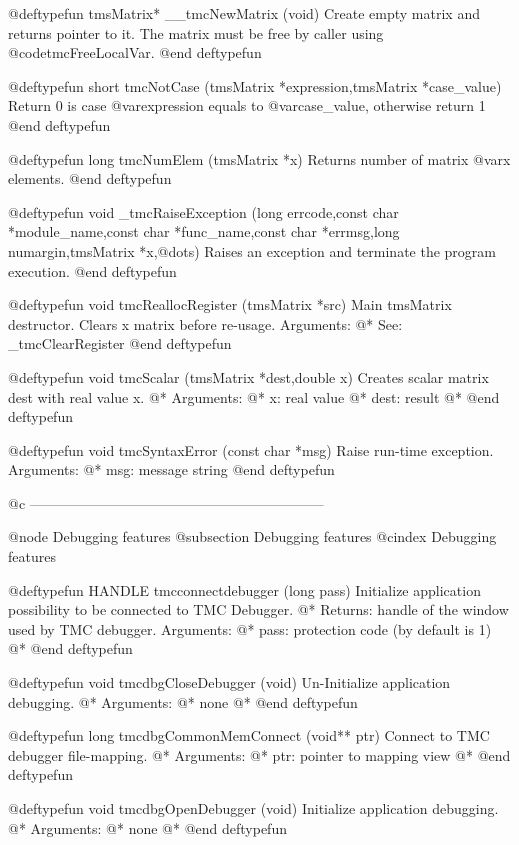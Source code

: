 @deftypefun    tmsMatrix* __tmcNewMatrix (void)
Create empty matrix and returns pointer to it. The matrix must be free by caller using @code{tmcFreeLocalVar}.
@end deftypefun


@deftypefun  short tmcNotCase (tmsMatrix *expression,tmsMatrix *case_value) 
Return 0 is case @var{expression} equals to @var{case_value}, otherwise return 1
@end deftypefun


@deftypefun  long tmcNumElem (tmsMatrix *x) 
Returns number of matrix @var{x} elements.
@end deftypefun



@deftypefun   void _tmcRaiseException (long errcode,const char *module_name,const char *func_name,const char *errmsg,long numargin,tmsMatrix *x,@dots{})
Raises an exception and terminate the program execution.
@end deftypefun


@deftypefun   void tmcReallocRegister (tmsMatrix *src) 
Main tmsMatrix destructor. Clears x matrix before re-usage.	 
Arguments: @*
See: _tmcClearRegister
@end deftypefun


@deftypefun         void tmcScalar (tmsMatrix *dest,double x)
Creates scalar matrix dest with real value x. @*
Arguments: @*
	x: real value @*
	dest: result @*
@end deftypefun
	


@deftypefun         void tmcSyntaxError (const char *msg)
Raise run-time exception.
Arguments: @*
	msg: message string
@end deftypefun

@c ---------------------------------------------------------------

@node Debugging features
@subsection Debugging features
@cindex  Debugging features


@deftypefun         HANDLE tmcconnectdebugger (long pass)
Initialize application possibility to be connected to TMC Debugger. @*
Returns: handle of the window used by TMC debugger.
Arguments: @*
	pass: protection code (by default is 1) @*
@end deftypefun


@deftypefun         void tmcdbgCloseDebugger (void)
Un-Initialize application debugging. @*
Arguments: @*
	none @*
@end deftypefun



@deftypefun         long tmcdbgCommonMemConnect (void** ptr)
Connect to TMC debugger file-mapping. @*
Arguments: @*
	ptr: pointer to mapping view @*
@end deftypefun



@deftypefun         void tmcdbgOpenDebugger (void)
Initialize application debugging. @*
Arguments: @*
	none @*
@end deftypefun


